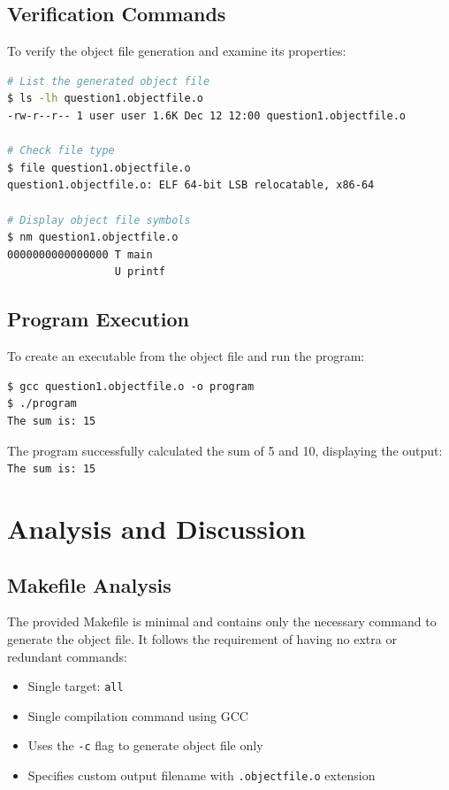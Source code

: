 \documentclass[12pt,a4paper]{article}
\begin{document}
\subsection{Verification Commands}
To verify the object file generation and examine its properties:

\begin{lstlisting}[language=bash, caption={Verification Commands}]
# List the generated object file
$ ls -lh question1.objectfile.o
-rw-r--r-- 1 user user 1.6K Dec 12 12:00 question1.objectfile.o

# Check file type
$ file question1.objectfile.o
question1.objectfile.o: ELF 64-bit LSB relocatable, x86-64

# Display object file symbols
$ nm question1.objectfile.o
0000000000000000 T main
                 U printf
\end{lstlisting}

\subsection{Program Execution}
To create an executable from the object file and run the program:
\begin{verbatim}
$ gcc question1.objectfile.o -o program
$ ./program
The sum is: 15
\end{verbatim}

The program successfully calculated the sum of 5 and 10, displaying the output: \texttt{The sum is: 15}

\section{Analysis and Discussion}

\subsection{Makefile Analysis}
The provided Makefile is minimal and contains only the necessary command to generate the object file. It follows the requirement of having no extra or redundant commands:

\begin{itemize}
    \item Single target: \texttt{all}
    \item Single compilation command using GCC
    \item Uses the \texttt{-c} flag to generate object file only
    \item Specifies custom output filename with \texttt{.objectfile.o} extension
\end{itemize}
\end{document}
